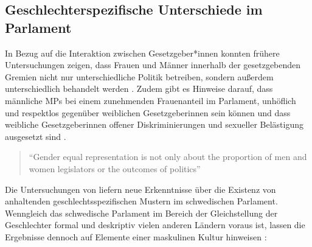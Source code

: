 \documentclass[12pt, 
    twoside=false, 
    bibliography=totoc, 
    numbers=endperiod, 
    headings=normal, 
    toc=chapterentrydotfill
    ]{scrbook}
\begin{document}

\subsection{Geschlechterspezifische Unterschiede im Parlament}\label{kapitel:geschlechterunterschiede}

In Bezug auf die Interaktion zwischen Gesetzgeber*innen konnten frühere Untersuchungen zeigen, dass Frauen und Männer innerhalb der gesetzgebenden Gremien nicht nur unterschiedliche Politik betreiben, sondern außerdem unterschiedlich behandelt werden \parencites[201]{erikson_2018}{childs_2004}. Zudem gibt es Hinweise darauf, dass männliche MPs bei einem zunehmenden Frauenanteil im Parlament, unhöflich und respektlos gegenüber weiblichen Gesetzgeberinnen sein können \parencites[201]{erikson_2018}{kathlene_1994}{kathlene_2004} und dass weibliche Gesetzgeberinnen offener Diskriminierungen und sexueller Belästigung ausgesetzt sind \parencites[201]{erikson_2018}[76]{lovenduski_2005}{lovenduski_2004}. 

\citereset
\begin{quote}
    \enquote{Gender equal representation is not only about the proportion of men and women legislators or the outcomes of politics}\parencite[197]{erikson_2018}
\end{quote}
 
Die Untersuchungen von \textcite{erikson_2018} liefern neue Erkenntnisse über die Existenz von anhaltenden geschlechtsspezifischen Mustern im schwedischen Parlament. Wenngleich das schwedische Parlament im Bereich der Gleichstellung der Geschlechter formal und deskriptiv vielen anderen Ländern voraus ist, lassen die Ergebnisse dennoch auf Elemente einer maskulinen Kultur hinweisen \parencite[211]{erikson_2018}:
\end{document}
